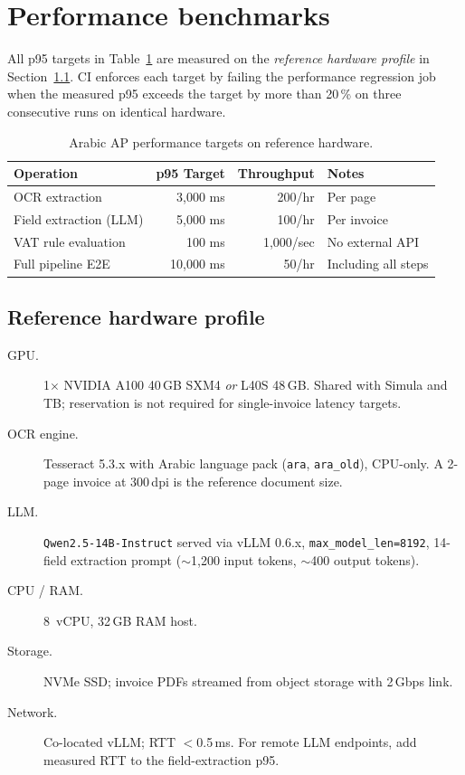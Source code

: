 \documentclass[11pt,a4paper,twoside]{report}
\begin{document}
\section{Performance benchmarks}

All p95 targets in Table~\ref{tab:ap-perf-targets} are measured on the
\emph{reference hardware profile} in Section~\ref{sec:ap-perf-hardware}.
CI enforces each target by failing the performance regression job when
the measured p95 exceeds the target by more than 20\,\% on three
consecutive runs on identical hardware.

\begin{table}[htbp]
\centering
\caption{Arabic AP performance targets on reference hardware.}
\label{tab:ap-perf-targets}
\footnotesize
\begin{tabularx}{\linewidth}{@{}l r r X@{}}
\toprule
\textbf{Operation} & \textbf{p95 Target} & \textbf{Throughput} & \textbf{Notes} \\ \midrule
OCR extraction & 3,000 ms & 200/hr & Per page \\
Field extraction (LLM) & 5,000 ms & 100/hr & Per invoice \\
VAT rule evaluation & 100 ms & 1,000/sec & No external API \\
Full pipeline E2E & 10,000 ms & 50/hr & Including all steps \\
\bottomrule
\end{tabularx}
\end{table}

\subsection{Reference hardware profile}
\label{sec:ap-perf-hardware}

\begin{description}
\item[GPU.] 1$\times$ NVIDIA A100 40\,GB SXM4 \emph{or} L40S 48\,GB.
Shared with Simula and TB; reservation is not required for
single-invoice latency targets.
\item[OCR engine.] Tesseract 5.3.x with Arabic language pack
(\texttt{ara}, \texttt{ara\_old}), CPU-only. A 2-page invoice
at 300\,dpi is the reference document size.
\item[LLM.] \texttt{Qwen2.5-14B-Instruct} served via vLLM 0.6.x,
\texttt{max\_model\_len=8192}, 14-field extraction prompt
($\sim$1,200 input tokens, $\sim$400 output tokens).
\item[CPU / RAM.] 8~vCPU, 32\,GB RAM host.
\item[Storage.] NVMe SSD; invoice PDFs streamed from object storage
with 2\,Gbps link.
\item[Network.] Co-located vLLM; RTT $<$0.5\,ms. For remote LLM
endpoints, add measured RTT to the field-extraction p95.
\end{description}
\end{document}
